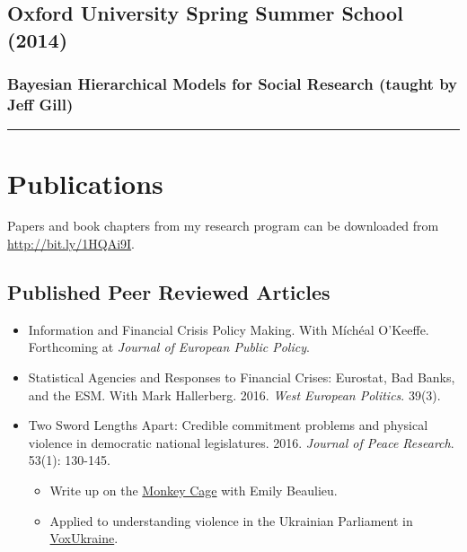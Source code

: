 \documentclass[a4paper]{article}
\begin{document}
{\subsection*{Oxford University Spring Summer School (2014)}

\subsubsection*{Bayesian Hierarchical Models for Social Research (taught by Jeff Gill)}

\vspace{0.25cm}
\medskip\hrule height 1pt
\vspace{0.5cm}


\section*{Publications}

\noindent Papers and book chapters from my research program can be downloaded from {\url{http://bit.ly/1HQAi9I}}.

\subsection*{Published Peer Reviewed Articles}

\begin{itemize}

    \item Information and Financial Crisis Policy Making. With M\'{i}ch\'{e}al O'Keeffe. Forthcoming at \emph{Journal of European Public Policy}.

    \item Statistical Agencies and Responses to Financial Crises: Eurostat, Bad Banks, and the ESM. With Mark Hallerberg. 2016. {\emph{West European Politics}}. 39(3).

    \item Two Sword Lengths Apart: Credible commitment problems and physical violence in democratic national legislatures. 2016. \emph{Journal of Peace Research}. 53(1): 130-145.

        \begin{itemize}
            \item Write up on the \href{http://t.co/fETbFCXcYU}{Monkey Cage} with Emily Beaulieu.

            \item Applied to understanding violence in the Ukrainian Parliament in \href{http://voxukraine.org/2015/12/24/causes-and-possible-solutions-to-brawling-in-the-ukrainian-parliament-en-2/}{VoxUkraine}.
    \end{itemize}


\end{itemize}}
\end{document}
